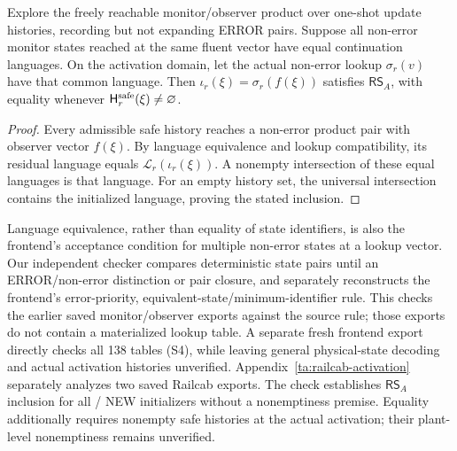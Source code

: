 \begin{lemma}
\label{lem:rs-a}
Explore the freely reachable monitor/observer product over one-shot update histories, recording but not expanding ERROR pairs. Suppose all non-error monitor states reached at the same fluent vector have equal continuation languages. On the activation domain, let the actual non-error lookup $\sigma_r(v)$ have that common language. Then $\iota_r(\xi)=\sigma_r(f(\xi))$ satisfies $\mathsf{RS}_A$, with equality whenever $\mathsf H_r^{\rm safe}(\xi)\ne\varnothing$.
\end{lemma}
\begin{proof}
Every admissible safe history reaches a non-error product pair with observer vector $f(\xi)$. By language equivalence and lookup compatibility, its residual language equals $\mathcal L_r(\iota_r(\xi))$. A nonempty intersection of these equal languages is that language. For an empty history set, the universal intersection contains the initialized language, proving the stated inclusion.
\end{proof}
Language equivalence, rather than equality of state identifiers, is also the frontend's acceptance condition for multiple non-error states at a lookup vector. Our independent checker compares deterministic state pairs until an ERROR/non-error distinction or pair closure, and separately reconstructs the frontend's error-priority, equivalent-state/minimum-identifier rule. This checks the earlier saved monitor/observer exports against the source rule; those exports do not contain a materialized lookup table. A separate fresh frontend export directly checks all 138 tables (S4), while leaving general physical-state decoding and actual activation histories unverified. Appendix~\ref{ta:railcab-activation} separately analyzes two saved Railcab exports. The check establishes $\mathsf{RS}_A$ inclusion for all \RSAExactNew/\RSNewOccurrences{} NEW initializers without a nonemptiness premise. Equality additionally requires nonempty safe histories at the actual activation; their plant-level nonemptiness remains unverified.


